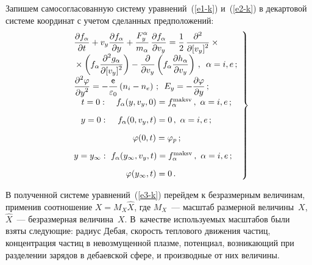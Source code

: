 \begin{multicols}{2}
Запишем самосогласованную систему уравнений~(\ref{e1-k}) и~(\ref{e2-k}) в декартовой системе 
координат с учетом сделанных предположений:
\begin{equation}
\left.
\begin{array}{l}
\fr{\partial f_\alpha}{\partial t}+
v_y\fr{\partial f_\alpha}{\partial y}+\fr{F_y^\alpha}{m_\alpha}\,\fr{\partial 
f_\alpha}{\partial v_y}=\fr{1}{2}\,\fr{\partial^2 }{\partial [v_y]^2}\times{}\\
{}\times \left( 
f_\alpha\fr{\partial^2 g_\alpha  }{\partial [v_y]^2}\right) -
\fr{\partial}{\partial v_y}\left( f_\alpha\fr{\partial h_\alpha}{\partial v_y}\right)\,,
\enskip \alpha=i,e\,;\\[6pt]
    \fr{\partial^2\varphi}{\partial y^2} =-\fr{{\sf e}}{\varepsilon_0}\left(n_i-n_e\right)\,;
    \enskip E_y=-
\fr{\partial\varphi}{\partial y}\,;\\[6pt]
\hspace*{3.1mm}    t=0:\  \hspace*{2.6mm}f_\alpha(y,v_y,0)=f_\alpha^{\mathrm{maksv}}\,,\ \alpha=i,e\,;\\[9pt]
\hspace*{2.9mm} y=0:\ \hspace*{2.8mm}f_\alpha(0,v_y,t)=0\,,\ \alpha=i,e\,;\\[9pt]
\hspace*{24.3mm}\varphi(0,t)=\varphi_p\,;\\[9pt]
y=y_\infty:\ f_\alpha(y_\infty, v_y, t)=f_\alpha^{\mathrm{maksv}}\,,\ \alpha=i,e\,;\\[9pt]
\hspace*{21.5mm}\varphi(y_\infty, t)=0\,.
\end{array}
\right \}
\label{e3-k}
\end{equation}

В полученной системе уравнений~(\ref{e3-k}) перейдем к безразмерным величинам, применив 
соотношение $X=M_X \hat{X}$, где $M_X$~--- масштаб размерной величины~$X$, $\hat{X}$~--- 
безразмерная величина~$X$. В~качестве используемых масштабов были взяты следующие: радиус 
Дебая, скорость теплового движения частиц, концентрация частиц в невозмущенной плазме, потенциал, 
возникающий при разделении зарядов в дебаевской сфере, и производные от них величины.


\end{multicols}
